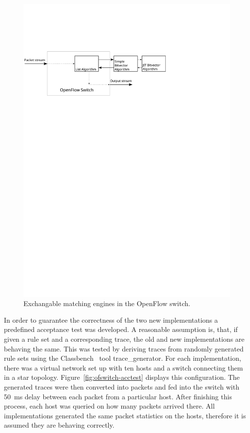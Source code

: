 \documentclass[a4paper,
		12pt,
		parskip=full,
		titlepage
		]{scrartcl}
\begin{document}
\begin{figure}
\centering
\includegraphics[height=0.2\textheight]{images/ofswitch}
\caption{Exchangable matching engines in the OpenFlow switch.}
\label{fig:ofswitch}
\end{figure}

In order to guarantee the correctness of the two new implementations a predefined acceptance test was developed.
A reasonable assumption is, that, if given a rule set and a corresponding trace, 
the old and new implementations are behaving the same.
This was tested by deriving traces from randomly generated rule sets using 
the Classbench~\cite{classbench_website} tool \textsf{trace\_generator}.
For each implementation, there was a virtual network set up with ten hosts and a switch connecting them in a star topology.
Figure~\ref{fig:ofswitch-acctest} displays this configuration.
The generated traces were then converted into packets and fed into the switch with 50\ ms delay between each packet from a particular host.
After finishing this process, each host was queried on how many packets arrived there.
All implementations generated the same packet statistics on the hosts, therefore it is assumed they are behaving correctly.
\end{document}
